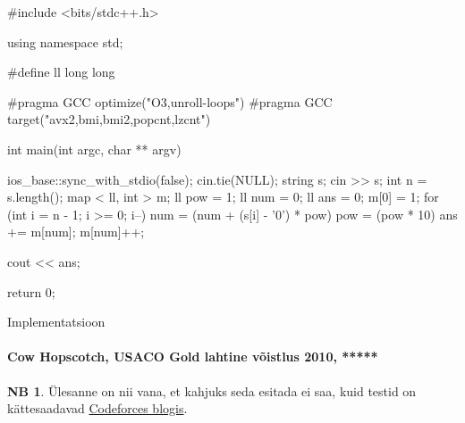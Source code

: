 \documentclass{trkut}
\theoremstyle{definition}
\newtheorem*{extra}{NB}
\begin{document}
\begin{cclol}
#include <bits/stdc++.h>

using namespace std;

#define ll long long

#pragma GCC optimize("O3,unroll-loops")
#pragma GCC target("avx2,bmi,bmi2,popcnt,lzcnt")

int main(int argc, char ** argv) {
  ios_base::sync_with_stdio(false);
  cin.tie(NULL);
  string s;
  cin >> s;
  int n = s.length();
  map < ll, int > m;
  ll pow = 1;
  ll num = 0;
  ll ans = 0;
  m[0] = 1;
  for (int i = n - 1; i >= 0; i--) {
    num = (num + (s[i] - '0') * pow) %
    pow = (pow * 10) %
    ans += m[num];
    m[num]++;
  }

  cout << ans;

  return 0;
}
\end{cclol}
\begin{kk}[H]
\caption{Implementatsioon}%
\end{kk}



\paragraph{Cow Hopscotch, USACO Gold lahtine võistlus 2010, *****}
\begin{extra}
Ülesanne on nii vana, et kahjuks seda esitada ei saa, kuid testid on kättesaadavad \href{https://codeforces.com/blog/entry/95032}{Codeforces blogis}.
\end{extra}
\end{document}
